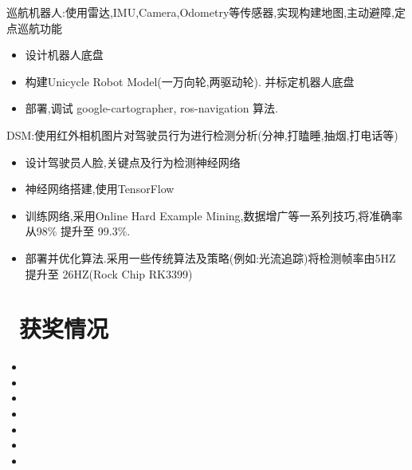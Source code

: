 \documentclass{resume}
\begin{document}

\begin{onehalfspacing}
巡航机器人:使用雷达,IMU,Camera,Odometry等传感器,实现构建地图,主动避障,定点巡航功能
\begin{itemize}
  \item 设计机器人底盘
  \item 构建Unicycle Robot Model(一万向轮,两驱动轮). 并标定机器人底盘
  \item 部署,调试 google-cartographer, ros-navigation 算法.
\end{itemize}
\end{onehalfspacing}


\begin{onehalfspacing}
DSM:使用红外相机图片对驾驶员行为进行检测分析(分神,打瞌睡,抽烟,打电话等)
\begin{itemize}
  \item 设计驾驶员人脸,关键点及行为检测神经网络
  \item 神经网络搭建,使用TensorFlow
  \item 训练网络,采用Online Hard Example Mining,数据增广等一系列技巧,将准确率从98\% 提升至 99.3\%.
  \item 部署并优化算法.采用一些传统算法及策略(例如:光流追踪)将检测帧率由5HZ 提升至 26HZ(Rock Chip RK3399)
\end{itemize}
\end{onehalfspacing}



\section{\faHeartO\ 获奖情况}
\begin{itemize}[parsep=0.5ex]
\item {}
\item {}
\item {}
\item {}
\item {}
\item {}
\item {}
\end{itemize}
\end{document}

